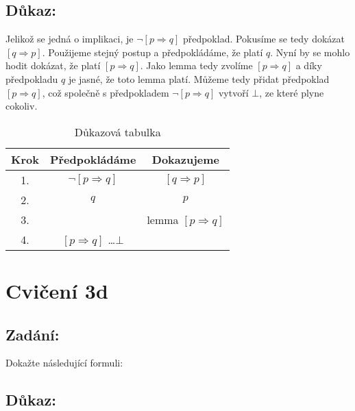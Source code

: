 \documentclass{article}
\begin{document}
\subsection{Důkaz:}

Jelikož se jedná o implikaci, je $\neg [p \Rightarrow q]$ předpoklad. Pokusíme se tedy dokázat $[q \Rightarrow p]$. Použijeme stejný postup a předpokládáme, že platí $q$. Nyní by se mohlo hodit dokázat, že platí $[p \Rightarrow q]$. Jako lemma tedy zvolíme $[p \Rightarrow q]$ a díky předpokladu $q$ je jasné, že toto lemma platí. Můžeme tedy přidat předpoklad $[p \Rightarrow q]$, což společně s předpokladem $\neg [p \Rightarrow q]$ vytvoří $\bot$, ze které plyne cokoliv.

\begin{table}[H]\centering

    \caption{Důkazová tabulka}

\begin{tabular}{|c|c|c|}
    
    
        \hline \textbf{Krok} & \textbf{Předpokládáme} & \textbf{Dokazujeme} \\ \hline \hline
    	1. & $\neg [p \Rightarrow q]$ & $[q \Rightarrow p]$ \\ \hline
    	2. & $q$ & $p$ \\ \hline
    	3. &  & lemma $[p \Rightarrow q]$ \\ \hline
    	4. & $[p \Rightarrow q]$ \dots $\bot$  &  \\ \hline
    
            
    	\end{tabular}
\end{table}

\section{Cvičení 3d}

\subsection{Zadání:}

Dokažte následující formuli:
$$$$

\subsection{Důkaz:}
\end{document}
